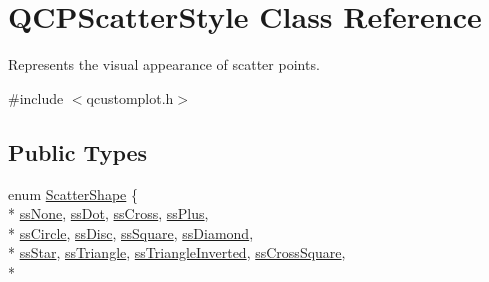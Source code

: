 \hypertarget{class_q_c_p_scatter_style}{}\section{Q\+C\+P\+Scatter\+Style Class Reference}
\label{class_q_c_p_scatter_style}


Represents the visual appearance of scatter points.  




{\ttfamily \#include $<$qcustomplot.\+h$>$}

\subsection*{Public Types}
\begin{DoxyCompactItemize}
\item 
enum \hyperlink{class_q_c_p_scatter_style_adb31525af6b680e6f1b7472e43859349}{Scatter\+Shape} \{ \\*
\hyperlink{class_q_c_p_scatter_style_adb31525af6b680e6f1b7472e43859349abd144c291ca274f77053ec68cab6c022}{ss\+None}, 
\hyperlink{class_q_c_p_scatter_style_adb31525af6b680e6f1b7472e43859349a06e15a735b79093a1d999c0374fa3aa1}{ss\+Dot}, 
\hyperlink{class_q_c_p_scatter_style_adb31525af6b680e6f1b7472e43859349a9eacd60f059dc3ef71bf249f515a6fe4}{ss\+Cross}, 
\hyperlink{class_q_c_p_scatter_style_adb31525af6b680e6f1b7472e43859349a2d7f1d3c1a148b9d9d17f2fd9cae5eb7}{ss\+Plus}, 
\\*
\hyperlink{class_q_c_p_scatter_style_adb31525af6b680e6f1b7472e43859349a7c92a110880d0ef2170dff3a5b4f7779}{ss\+Circle}, 
\hyperlink{class_q_c_p_scatter_style_adb31525af6b680e6f1b7472e43859349a281fe1434696dcbab3aa6b9ccfbb09e9}{ss\+Disc}, 
\hyperlink{class_q_c_p_scatter_style_adb31525af6b680e6f1b7472e43859349a279e48703ddc9f1cf4a61d3e2817ab3c}{ss\+Square}, 
\hyperlink{class_q_c_p_scatter_style_adb31525af6b680e6f1b7472e43859349a4fc5929df1b2dad0a3cb2ef2c8b6e633}{ss\+Diamond}, 
\\*
\hyperlink{class_q_c_p_scatter_style_adb31525af6b680e6f1b7472e43859349a6047a2d64e41f1d6ce54445d595d442f}{ss\+Star}, 
\hyperlink{class_q_c_p_scatter_style_adb31525af6b680e6f1b7472e43859349a74a8d4eff1d97b57c53a60d0003453c3}{ss\+Triangle}, 
\hyperlink{class_q_c_p_scatter_style_adb31525af6b680e6f1b7472e43859349a6156274d21d8b4115197567d3ea2d9a8}{ss\+Triangle\+Inverted}, 
\hyperlink{class_q_c_p_scatter_style_adb31525af6b680e6f1b7472e43859349a7081310936c200c6c78e34c172f72d07}{ss\+Cross\+Square}, 
\\*

\end{DoxyCompactItemize}
